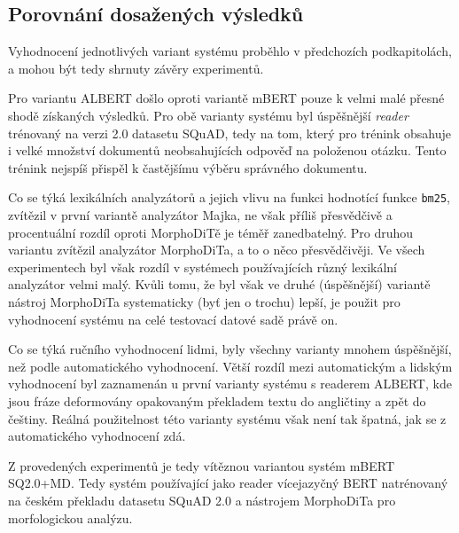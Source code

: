 \subsection{Porovnání dosažených výsledků}
Vyhodnocení jednotlivých variant systému proběhlo v předchozích podkapitolách, a mohou být tedy shrnuty závěry experimentů. \par
Pro variantu ALBERT došlo oproti variantě mBERT pouze k velmi malé přesné shodě získaných výsledků. Pro obě varianty systému byl úspěšnější \emph{reader} trénovaný na verzi 2.0 datasetu SQuAD, tedy na tom, který pro trénink obsahuje i velké množství dokumentů neobsahujících odpověď na položenou otázku. Tento trénink nejspíš přispěl k častějšímu výběru správného dokumentu.\par
Co se týká lexikálních analyzátorů a jejich vlivu na funkci hodnotící funkce \texttt{bm25}, zvítězil v první variantě analyzátor Majka, ne však příliš přesvědčivě a procentuální rozdíl oproti MorphoDiTě je téměř zanedbatelný. Pro druhou variantu zvítězil analyzátor MorphoDiTa, a to o něco přesvědčivěji. Ve všech experimentech byl však rozdíl v systémech používajících různý lexikální analyzátor velmi malý. Kvůli tomu, že byl však ve druhé (úspěšnější) variantě nástroj MorphoDiTa systematicky (byť jen o trochu) lepší, je použit pro vyhodnocení systému na celé testovací datové sadě právě on.\par
Co se týká ručního vyhodnocení lidmi, byly všechny varianty mnohem úspěšnější, než podle automatického vyhodnocení. Větší rozdíl mezi automatickým a lidským vyhodnocení byl zaznamenán u první varianty systému s readerem ALBERT, kde jsou fráze deformovány opakovaným překladem textu do angličtiny a zpět do češtiny. Reálná použitelnost této varianty systému však není tak špatná, jak se z automatického vyhodnocení zdá.\par
Z provedených experimentů je tedy vítěznou variantou systém mBERT SQ2.0+MD. Tedy systém používající jako reader vícejazyčný BERT natrénovaný na českém překladu datasetu SQuAD 2.0 a nástrojem MorphoDiTa pro morfologickou analýzu.

